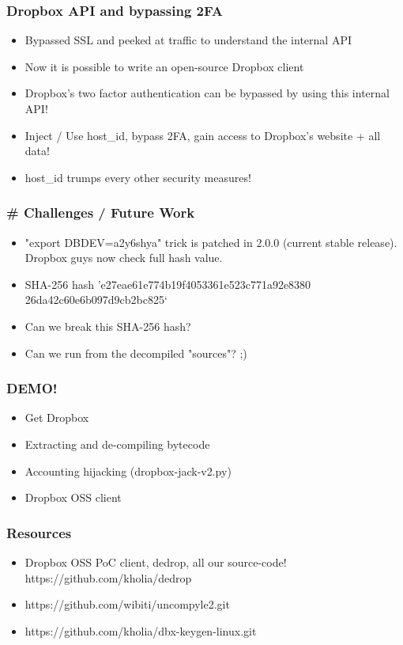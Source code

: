 \documentclass{beamer}
\newcommand\myfont{\fontsize{14}{20}\selectfont}
\begin{document}
\begin{frame}
\frametitle{Dropbox API and bypassing 2FA}
\begin{itemize}
\itemsep 2em
\item Bypassed SSL and peeked at traffic to understand the internal API
\item Now it is possible to write an open-source Dropbox client
\item Dropbox's two factor authentication can be bypassed by using this internal API!
\item Inject / Use host\_id, bypass 2FA, gain access to Dropbox's website + all data!
\item host\_id trumps every other security measures!
\end{itemize}
\end{frame}

\begin{frame}
\frametitle{\# Challenges / Future Work}
\begin{itemize}
\itemsep 2em
\item "export DBDEV=a2y6shya" trick is patched in 2.0.0 (current stable release). Dropbox guys now check full hash value.
\item SHA-256 hash 'e27eae61e774b19f4053361e523c771a92e8380\\26da42c60e6b097d9cb2bc825‘
\item Can we break this SHA-256 hash?
\item Can we run from the decompiled "sources"? ;)
\end{itemize}
\end{frame}

\begin{frame}
\frametitle{DEMO!}
\myfont
\begin{itemize}
\itemsep 2.4em
\item Get Dropbox
\item Extracting and de-compiling bytecode
\item Accounting hijacking (dropbox-jack-v2.py)
\item Dropbox OSS client
\end{itemize}
\end{frame}

\begin{frame}
\frametitle{Resources}
\myfont
\begin{itemize}
\itemsep 2em
\item Dropbox OSS PoC client, dedrop, all our source-code! \\
      \vspace{0.9em} https://github.com/kholia/dedrop
\item https://github.com/wibiti/uncompyle2.git
\item https://github.com/kholia/dbx-keygen-linux.git
\end{itemize}
\end{frame}
\end{document}
